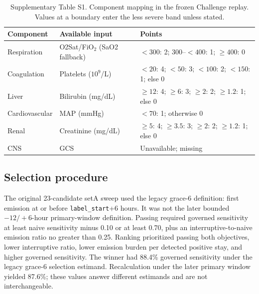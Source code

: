 \documentclass[11pt]{article}
\begin{document}
\begin{table}[htbp]
\centering\small
\caption{Supplementary Table S1. Component mapping in the frozen Challenge
replay. Values at a boundary enter the less severe band unless stated.}
\begin{tabular}{@{}lll@{}}
\toprule
Component & Available input & Points \\
\midrule
Respiration & O2Sat/FiO$_2$ (SaO2 fallback) & $<300$: 2; $300$--$<400$: 1; $\geq400$: 0 \\
Coagulation & Platelets ($10^9$/L) & $<20$: 4; $<50$: 3; $<100$: 2; $<150$: 1; else 0 \\
Liver & Bilirubin (mg/dL) & $\geq12$: 4; $\geq6$: 3; $\geq2$: 2; $\geq1.2$: 1; else 0 \\
Cardiovascular & MAP (mmHg) & $<70$: 1; otherwise 0 \\
Renal & Creatinine (mg/dL) & $\geq5$: 4; $\geq3.5$: 3; $\geq2$: 2; $\geq1.2$: 1; else 0 \\
CNS & GCS & Unavailable; missing \\
\bottomrule
\end{tabular}
\end{table}

\subsection*{Selection procedure}
The original 23-candidate setA sweep used the legacy grace-6 definition: first
emission at or before \texttt{label\_start}+6 hours. It was not the later
bounded $-12/+6$-hour primary-window definition. Passing required governed
sensitivity at least naive sensitivity minus 0.10 or at least 0.70, plus an
interruptive-to-naive emission ratio no greater than 0.25. Ranking prioritized
passing both objectives, lower interruptive ratio, lower emission burden per
detected positive stay, and higher governed sensitivity. The winner had 88.4\%
governed sensitivity under the legacy grace-6 selection estimand. Recalculation
under the later primary window yielded 87.6\%; these values answer different
estimands and are not interchangeable.

\begin{table}[htbp]
\centering\scriptsize
\setlength{\tabcolsep}{2.5pt}
\caption{Supplementary Table S2. Complete 23-candidate setA selection grid under
the legacy grace-6 estimand. Persist and Refrac are minutes; Base and Gate are
baseline and page-gate states.}
\resizebox{\textwidth}{!}{}
\end{table}
\end{document}
